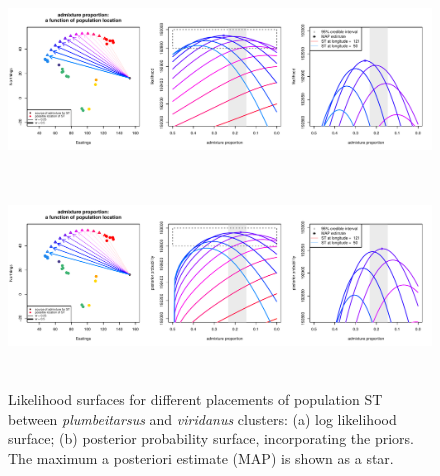 \documentclass[12pt]{article}
\begin{document}
\begin{figure}
	\centering
			{\includegraphics[width=6in,height=2in]{figs/warblers/admix_prop_func_loc_lnl.pdf}}
			{\includegraphics[width=6in,height=2in]{figs/warblers/admix_prop_func_loc_prob.pdf}}
	\caption{Likelihood surfaces for different placements of population ST between \textit{plumbeitarsus} and \textit{viridanus} clusters: (a) log likelihood surface; (b) posterior probability surface, incorporating the priors. The maximum a posteriori estimate (MAP) is shown as a star. }\label{sfig:admix_prop_func_loc}
\end{figure}
\end{document}
